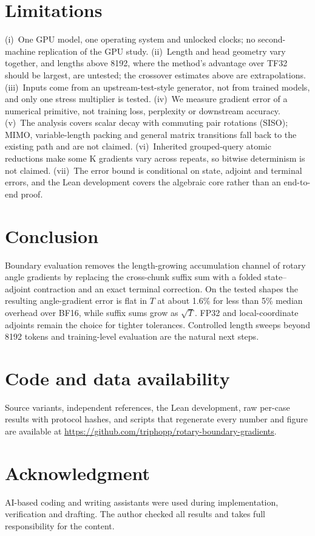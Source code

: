 \section{Limitations}\label{sec:limits}
(i)~One GPU model, one operating system and unlocked clocks; no second-machine replication of the GPU study. (ii)~Length and head geometry vary together, and lengths above 8192, where the method's advantage over TF32 should be largest, are untested; the crossover estimates above are extrapolations. (iii)~Inputs come from an upstream-test-style generator, not from trained models, and only one stress multiplier is tested. (iv)~We measure gradient error of a numerical primitive, not training loss, perplexity or downstream accuracy. (v)~The analysis covers scalar decay with commuting pair rotations (SISO); MIMO, variable-length packing and general matrix transitions fall back to the existing path and are not claimed. (vi)~Inherited grouped-query atomic reductions make some K gradients vary across repeats, so bitwise determinism is not claimed. (vii)~The error bound is conditional on state, adjoint and terminal errors, and the Lean development covers the algebraic core rather than an end-to-end proof.

\section{Conclusion}
Boundary evaluation removes the length-growing accumulation channel of rotary angle gradients by replacing the cross-chunk suffix sum with a folded state--adjoint contraction and an exact terminal correction. On the tested shapes the resulting angle-gradient error is flat in $T$ at about 1.6\% for less than 5\% median overhead over BF16, while suffix sums grow as $\sqrt T$. FP32 and local-coordinate adjoints remain the choice for tighter tolerances. Controlled length sweeps beyond 8192 tokens and training-level evaluation are the natural next steps.

\section*{Code and data availability}
Source variants, independent references, the Lean development, raw per-case results with protocol hashes, and scripts that regenerate every number and figure are available at \url{https://github.com/triphopp/rotary-boundary-gradients}.

\section*{Acknowledgment}
AI-based coding and writing assistants were used during implementation, verification and drafting. The author checked all results and takes full responsibility for the content.

